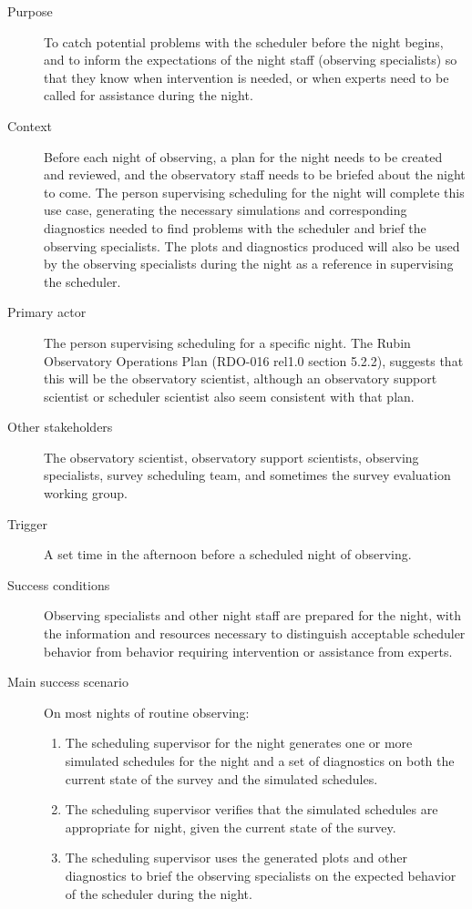 \begin{description}
\item[{Purpose}] To catch potential problems with the scheduler before the night begins, and to inform the expectations of the night staff (observing specialists) so that they know when intervention is needed, or when experts need to be called for assistance during the night.
\item[{Context}] Before each night of observing, a plan for the night needs to be created and reviewed, and the observatory staff needs to be briefed about the night to come. The person supervising scheduling for the night will complete this use case, generating the necessary simulations and corresponding diagnostics needed to find problems with the scheduler and brief the observing specialists. The plots and diagnostics produced will also be used by the observing specialists during the night as a reference in supervising the scheduler.
\item[{Primary actor}] The person supervising scheduling for a specific night. The Rubin Observatory Operations Plan (RDO-016 rel1.0 section 5.2.2), suggests that this will be the observatory scientist, although an observatory support scientist or scheduler scientist also seem consistent with that plan.
\item[{Other stakeholders}] The observatory scientist, observatory support scientists, observing specialists, survey scheduling team, and sometimes the survey evaluation working group.
\item[{Trigger}] A set time in the afternoon before a scheduled night of observing.
\item[{Success conditions}] Observing specialists and other night staff are prepared for the night, with the information and resources necessary to distinguish acceptable scheduler behavior from behavior requiring intervention or assistance from experts.
\item[{Main success scenario}] On most nights of routine observing:
\begin{enumerate}
\item The scheduling supervisor for the night generates one or more simulated schedules for the night and a set of diagnostics on both the current state of the survey and the simulated schedules.
\item The scheduling supervisor verifies that the simulated schedules are appropriate for night, given the current state of the survey.
\item The scheduling supervisor uses the generated plots and other diagnostics to brief the observing specialists on the expected behavior of the scheduler during the night.

\end{enumerate}
\end{description}
